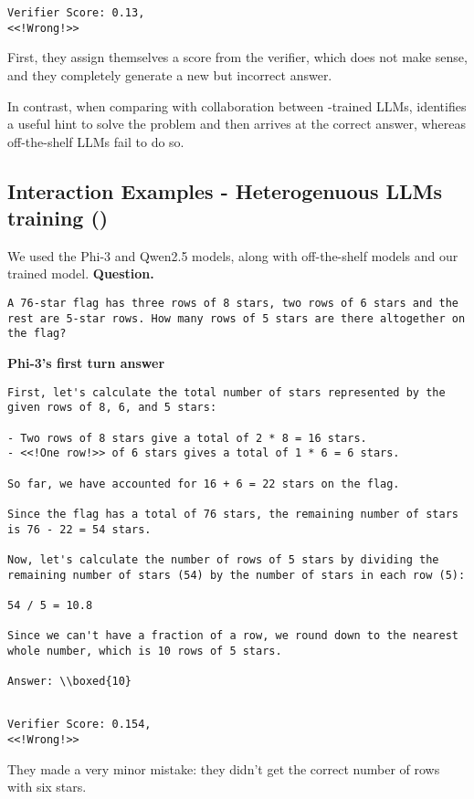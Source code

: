\begin{lstlisting}
Verifier Score: 0.13,
<<!Wrong!>> 
\end{lstlisting}
First, they assign themselves a score from the verifier, which does not make sense, and they completely generate a new but incorrect answer.

In contrast, when comparing with collaboration between \oursspace-trained LLMs, \oursspace identifies a useful hint to solve the problem and then arrives at the correct answer, whereas off-the-shelf LLMs fail to do so.
\newpage
\subsection{Interaction Examples - Heterogenuous LLMs training  ()}
We used the Phi-3 and Qwen2.5 models, along with off-the-shelf models and our \oursspace trained model.
\textbf{Question. }
\begin{lstlisting}
A 76-star flag has three rows of 8 stars, two rows of 6 stars and the rest are 5-star rows. How many rows of 5 stars are there altogether on the flag?

\end{lstlisting}
\textbf{Phi-3's first turn answer} 
\begin{lstlisting}
First, let's calculate the total number of stars represented by the given rows of 8, 6, and 5 stars:

- Two rows of 8 stars give a total of 2 * 8 = 16 stars.
- <<!One row!>> of 6 stars gives a total of 1 * 6 = 6 stars.

So far, we have accounted for 16 + 6 = 22 stars on the flag.

Since the flag has a total of 76 stars, the remaining number of stars is 76 - 22 = 54 stars.

Now, let's calculate the number of rows of 5 stars by dividing the remaining number of stars (54) by the number of stars in each row (5):

54 / 5 = 10.8

Since we can't have a fraction of a row, we round down to the nearest whole number, which is 10 rows of 5 stars.

Answer: \\boxed{10}


\end{lstlisting}
\begin{lstlisting}
Verifier Score: 0.154,
<<!Wrong!>> 
\end{lstlisting}
They made a very minor mistake: they didn't get the correct number of rows with six stars.

